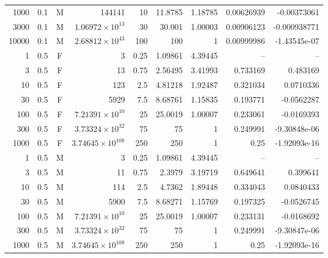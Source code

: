 \begin{longtable}{rrcrrrrrr}
1000 & 0.1 & M & 144141 & 10 & 11.8785 & 1.18785 & 0.00626939 & -0.00373061\\
3000 & 0.1 & M & $1.06972\!\times\!10^{13}$ & 30 & 30.001 & 1.00003 & 0.00906123 & -0.000938771\\
10000 & 0.1 & M & $2.68812\!\times\!10^{43}$ & 100 & 100 & 1 & 0.00999986 & -1.43545e-07\\
1 & 0.5 & F & 3 & 0.25 & 1.09861 & 4.39445 & -- & --\\
3 & 0.5 & F & 13 & 0.75 & 2.56495 & 3.41993 & 0.733169 & 0.483169\\
10 & 0.5 & F & 123 & 2.5 & 4.81218 & 1.92487 & 0.321034 & 0.0710336\\
30 & 0.5 & F & 5929 & 7.5 & 8.68761 & 1.15835 & 0.193771 & -0.0562287\\
100 & 0.5 & F & $7.21391\!\times\!10^{10}$ & 25 & 25.0019 & 1.00007 & 0.233061 & -0.0169393\\
300 & 0.5 & F & $3.73324\!\times\!10^{32}$ & 75 & 75 & 1 & 0.249991 & -9.30848e-06\\
1000 & 0.5 & F & $3.74645\!\times\!10^{108}$ & 250 & 250 & 1 & 0.25 & -1.92093e-16\\
1 & 0.5 & M & 3 & 0.25 & 1.09861 & 4.39445 & -- & --\\
3 & 0.5 & M & 11 & 0.75 & 2.3979 & 3.19719 & 0.649641 & 0.399641\\
10 & 0.5 & M & 114 & 2.5 & 4.7362 & 1.89448 & 0.334043 & 0.0840433\\
30 & 0.5 & M & 5900 & 7.5 & 8.68271 & 1.15769 & 0.197325 & -0.0526745\\
100 & 0.5 & M & $7.21391\!\times\!10^{10}$ & 25 & 25.0019 & 1.00007 & 0.233131 & -0.0168692\\
300 & 0.5 & M & $3.73324\!\times\!10^{32}$ & 75 & 75 & 1 & 0.249991 & -9.30847e-06\\
1000 & 0.5 & M & $3.74645\!\times\!10^{108}$ & 250 & 250 & 1 & 0.25 & -1.92093e-16\\
\bottomrule\end{longtable}\endgroup
